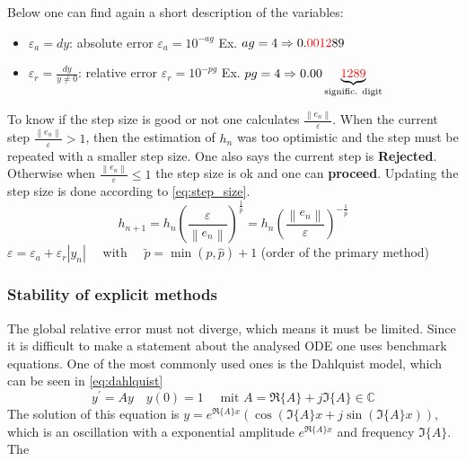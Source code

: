 Below one can find again a short description of the variables:
\begin{itemize}
    \item $\varepsilon_{a}=dy$: absolute error $\varepsilon_{a}=10^{-ag}$ \newline
    Ex. $ag=4 \Rightarrow 0.\textcolor{red}{0012}89$
    \item $\varepsilon_{r}=\frac{dy}{y\ne 0}$: relative error $\varepsilon_{r}=10^{-pg}$\newline
    Ex. $pg=4 \Rightarrow 0.00\underbrace{\textcolor{red}{1289}}_{\text{signific. digit}}$
\end{itemize}


To know if the step size is good or not one calculates $\frac{\left\|e_{n}\right\|}{\varepsilon}$. When the current step $\frac{\left\|e_{n}\right\|}{\varepsilon}>1$, then the estimation of $h_{n}$ was too optimistic and the step must be repeated with a smaller step size. One also says the current step is \textbf{Rejected}. Otherwise when $\frac{\left\|e_{n}\right\|}{\varepsilon}\leq 1$ the step size is ok and one can \textbf{proceed}.
Updating the step size is done according to \autoref{eq:step_size}.
\begin{equation}\label{eq:step_size}
    h_{n+1}=h_{n}\left(\frac{\varepsilon}{\left\|e_{n}\right\|}\right)^{\frac{1}{\bar{p}}}=h_{n}\left(\frac{\left\|e_{n}\right\|}{\varepsilon}\right)^{-\frac{1}{\bar{p}}}
\end{equation}
$\varepsilon=\varepsilon_{a}+\varepsilon_{r}\left|y_{n}\right| \quad$ with $\quad \tilde{p}=\min (p, \hat{p})+1$ (order of the primary method)


\subsubsection{Stability of explicit methods}
The global relative error must not diverge, which means it must be limited. Since it is difficult to make a statement about the analysed ODE one uses benchmark equations. One of the most commonly used ones is the Dahlquist model, which can be seen in \autoref{eq:dahlquist}
\begin{equation}\label{eq:dahlquist}
    y^{\prime}=A y \quad y(0)=1 \quad \text { mit } A=\Re\{A\}+j \Im\{A\} \in \mathbb{C}
\end{equation}
The solution of this equation is $y=e^{\Re\{A\} x}\left(\cos (\Im\{A\} x+j \sin (\Im\{A\} x))\right.$, which is an oscillation with a exponential amplitude $e^{\Re\{A\} x}$ and  frequency $\Im\{A\}$. The 
